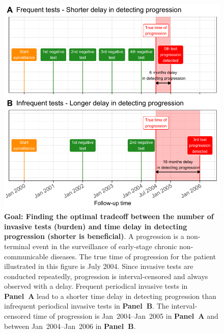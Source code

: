 \begin{figure}
\centerline{\includegraphics{images/delay_explanation.pdf}}
\caption{\small{\textbf{Goal: Finding the optimal tradeoff between the number of invasive tests (burden) and time delay in detecting progression (shorter is beneficial)}. A progression is a non-terminal event in the surveillance of early-stage chronic non-communicable diseases. The true time of progression for the patient illustrated in this figure is July 2004. Since invasive tests are conducted repeatedly, progression is interval-censored and always observed with a delay. Frequent periodical invasive tests in \textbf{Panel~A} lead to a shorter time delay in detecting progression than infrequent periodical invasive tests in \textbf{Panel~B}. The interval-censored time of progression is Jan~2004--Jan~2005 in \textbf{Panel~A} and between Jan~2004--Jan~2006 in \textbf{Panel~B}.}} 
\label{fig:delay_explanation}
\end{figure}

